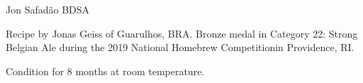 \begin{recipe}{Jon Safadão BDSA}

\begin{aboutblock}
Recipe by Jonas Geiss of Guarulhos, BRA. Bronze medal in Category 22: Strong
Belgian Ale during the 2019 National Homebrew Competitionin Providence, RI.
\sourceaha
\end{aboutblock}


\begin{methodandtiming}
 
\begin{mashsteps}
\end{mashsteps}

\begin{fermentationsteps}
\end{fermentationsteps}

\begin{directions}
Condition for 8 months at room temperature.
\end{directions}

\end{methodandtiming}

\recipebreak

\begin{ingredientsblock}

\begin{malts}
\end{malts}

\begin{hops}
\end{hops}


\end{ingredientsblock}

\end{recipe}
